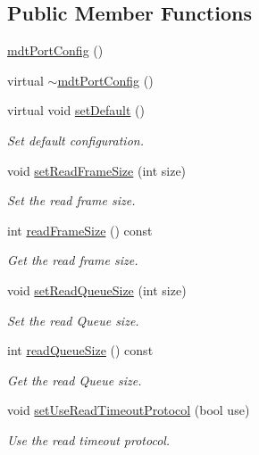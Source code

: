 \subsection*{Public Member Functions}
\begin{DoxyCompactItemize}
\item 
\hyperlink{classmdt_port_config_a7c97a56ca19b074bcfc56672086f8af8}{mdt\-Port\-Config} ()
\item 
virtual \hyperlink{classmdt_port_config_a6dee4709117278c20f9134220770a6cd}{$\sim$mdt\-Port\-Config} ()
\item 
virtual void \hyperlink{classmdt_port_config_a1cad2f21252411977fe328f89b68fbfb}{set\-Default} ()
\begin{DoxyCompactList}\small\item\em Set default configuration. \end{DoxyCompactList}\item 
void \hyperlink{classmdt_port_config_a02f3c9744b0d7a61853ab58467278bbc}{set\-Read\-Frame\-Size} (int size)
\begin{DoxyCompactList}\small\item\em Set the read frame size. \end{DoxyCompactList}\item 
int \hyperlink{classmdt_port_config_ad315f8f97723abe161792c9d9a1375ec}{read\-Frame\-Size} () const 
\begin{DoxyCompactList}\small\item\em Get the read frame size. \end{DoxyCompactList}\item 
void \hyperlink{classmdt_port_config_a04d8e81844deaff20a890ea24e2f9634}{set\-Read\-Queue\-Size} (int size)
\begin{DoxyCompactList}\small\item\em Set the read Queue size. \end{DoxyCompactList}\item 
int \hyperlink{classmdt_port_config_aff0260f72ca05715efe3f70850e7a151}{read\-Queue\-Size} () const 
\begin{DoxyCompactList}\small\item\em Get the read Queue size. \end{DoxyCompactList}\item 
void \hyperlink{classmdt_port_config_a5e7857a56ab2baff4bd0a77290b3c742}{set\-Use\-Read\-Timeout\-Protocol} (bool use)
\begin{DoxyCompactList}\small\item\em Use the read timeout protocol. \end{DoxyCompactList}\item 

\end{DoxyCompactItemize}
